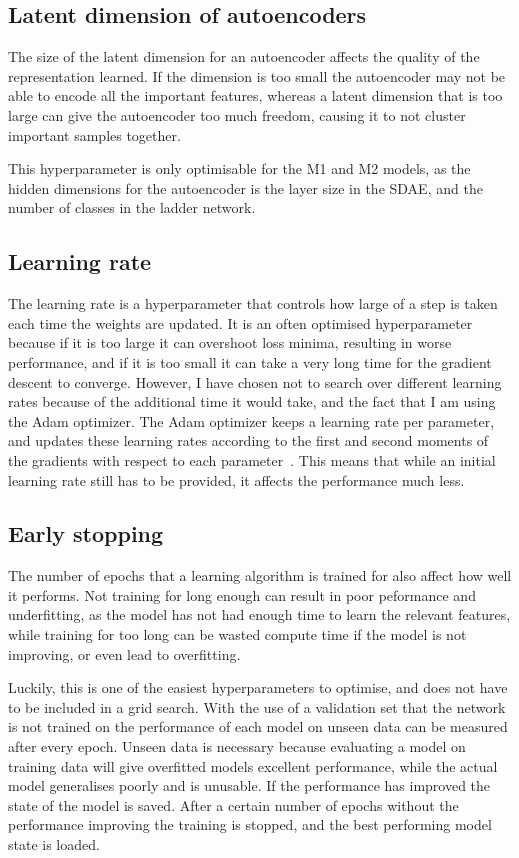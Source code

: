 \documentclass[12pt,a4paper,twoside,openright]{report}
\begin{document}
\subsection{Latent dimension of autoencoders}
The size of the latent dimension for an autoencoder affects the quality of the representation learned. If the dimension is too small the 
autoencoder may not be able to encode all the important features, whereas a latent dimension that is too large can give the autoencoder 
too much freedom, causing it to not cluster important samples together.

This hyperparameter is only optimisable for the M1 and M2 models, as the hidden dimensions for the autoencoder is the layer size in the SDAE,
and the number of classes in the ladder network.

\subsection{Learning rate}
The learning rate is a hyperparameter that controls how large of a step is taken each time the weights are updated. It is an often
optimised hyperparameter because if it is too large it can overshoot loss minima, resulting in worse performance, and if it is too 
small it can take a very long time for the gradient descent to converge. However, I have chosen not to search over different learning 
rates because of the additional time it would take, and the fact that I am using the Adam optimizer. The Adam optimizer keeps a 
learning rate per parameter, and updates these learning rates according to the first and second moments of the gradients with respect to each 
parameter~\cite{DBLP:journals/corr/KingmaB14}. This means that while an initial learning rate still has to be provided, it affects the 
performance much less.

\subsection{Early stopping}
The number of epochs that a learning algorithm is trained for also affect how well it performs. Not training for long enough can result in
poor peformance and underfitting, as the model has not had enough time to learn the relevant features, while training for too long can
be wasted compute time if the model is not improving, or even lead to overfitting.

Luckily, this is one of the easiest hyperparameters to optimise, and does not have to be included in a grid search. 
With the use of a validation set that the network is not trained on the performance of each model on unseen data can be measured after 
every epoch. Unseen data is necessary because evaluating a model on training data will give overfitted models excellent performance, 
while the actual model generalises poorly and is unusable.
If the performance has improved the state of the model is saved. After a certain number of epochs without the performance improving 
the training is stopped, and the best performing model state is loaded.
\end{document}
